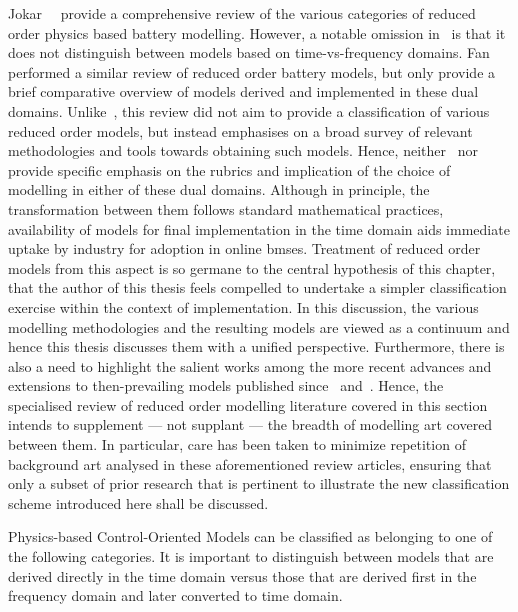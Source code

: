 Jokar~\etal~\cite{Jokar2016} provide a comprehensive review of the various categories of reduced order physics based
battery modelling. However, a notable omission in~\cite{Jokar2016} is that it does not distinguish between models based
on time-vs-frequency domains. Fan~\etal{}~\cite{Fan2015} performed a similar review of reduced order battery models, but
only provide a brief comparative overview of models derived and implemented in these dual domains.
Unlike~\cite{Jokar2016}, this review did not aim to provide a classification of various reduced order models, but
instead emphasises on a broad survey of relevant methodologies and tools towards obtaining such models. Hence,
neither~\cite{Jokar2016} nor~\cite{Fan2015} provide specific emphasis on the rubrics and implication of the choice of
modelling in either of these dual domains. Although in principle, the transformation between them follows standard
mathematical practices,~ availability of models for final implementation in the time domain
aids immediate uptake by industry for adoption in online \gls{bms}es. Treatment of reduced order models from this aspect
is so germane to the central hypothesis of this chapter, that the
author of this thesis feels compelled to undertake a simpler classification exercise within the context of
implementation. In this discussion, the various modelling methodologies and the resulting models are viewed as a
continuum and hence this thesis discusses them with a unified perspective. Furthermore, there is also a need to
highlight the salient works among the more recent advances and extensions to then-prevailing models published
since~\cite{Jokar2016} and~\cite{Fan2015}. Hence, the specialised review of reduced order modelling literature covered
in this section intends to supplement ---  not supplant --- the breadth of modelling art covered between them. In
particular, care has been taken to minimize repetition of background art analysed in these aforementioned review
articles, ensuring that only a subset of prior research that is pertinent to illustrate the new classification scheme
introduced here shall be discussed.

Physics-based Control-Oriented Models can be classified as belonging to one of the following categories. It is important to distinguish between models that are derived directly in the time domain
versus those that are derived first in the frequency domain and later converted to time domain.


